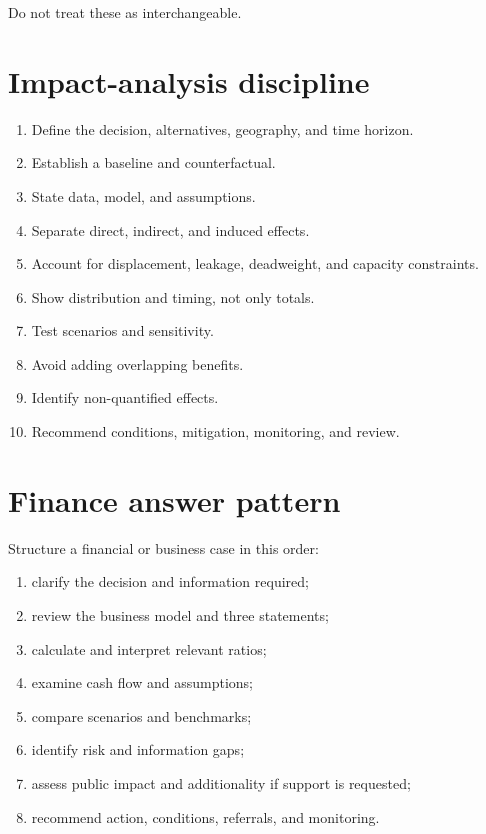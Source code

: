 \documentclass[11pt,letterpaper,oneside,openany]{book}
\begin{document}
Do not treat these as interchangeable.


\section[Impact-analysis discipline]{Impact-analysis discipline}
\begin{enumerate}
\item Define the decision, alternatives, geography, and time horizon.
\item Establish a baseline and counterfactual.
\item State data, model, and assumptions.
\item Separate direct, indirect, and induced effects.
\item Account for displacement, leakage, deadweight, and capacity constraints.
\item Show distribution and timing, not only totals.
\item Test scenarios and sensitivity.
\item Avoid adding overlapping benefits.
\item Identify non-quantified effects.
\item Recommend conditions, mitigation, monitoring, and review.
\end{enumerate}


\section[Finance answer pattern]{Finance answer pattern}
Structure a financial or business case in this order:


\begin{enumerate}
\item clarify the decision and information required;
\item review the business model and three statements;
\item calculate and interpret relevant ratios;
\item examine cash flow and assumptions;
\item compare scenarios and benchmarks;
\item identify risk and information gaps;
\item assess public impact and additionality if support is requested;
\item recommend action, conditions, referrals, and monitoring.
\end{enumerate}
\end{document}
